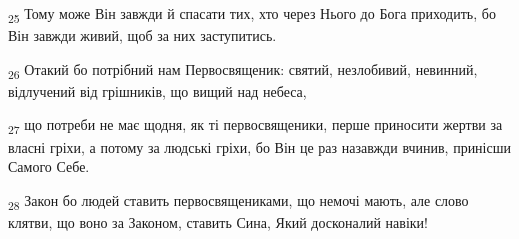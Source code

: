 \begin{tcolorbox}
\textsubscript{25} Тому може Він завжди й спасати тих, хто через Нього до Бога приходить, бо Він завжди живий, щоб за них заступитись.
\end{tcolorbox}
\begin{tcolorbox}
\textsubscript{26} Отакий бо потрібний нам Первосвященик: святий, незлобивий, невинний, відлучений від грішників, що вищий над небеса,
\end{tcolorbox}
\begin{tcolorbox}
\textsubscript{27} що потреби не має щодня, як ті первосвященики, перше приносити жертви за власні гріхи, а потому за людські гріхи, бо Він це раз назавжди вчинив, принісши Самого Себе.
\end{tcolorbox}
\begin{tcolorbox}
\textsubscript{28} Закон бо людей ставить первосвящениками, що немочі мають, але слово клятви, що воно за Законом, ставить Сина, Який досконалий навіки!
\end{tcolorbox}
